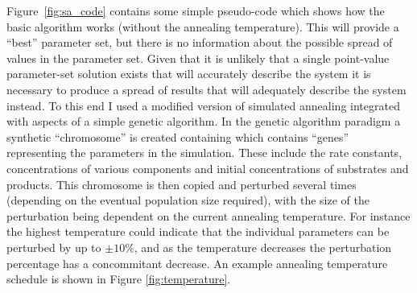 Figure~\ref{fig:sa_code} contains some simple pseudo-code which shows how the basic algorithm works (without the annealing temperature). This will provide a ``best'' parameter set, but there is no information about the possible spread of values in the parameter set. Given that it is unlikely that a single point-value parameter-set solution exists that will accurately describe the system it is necessary to produce a spread of results that will adequately describe the system instead. To this end I used a modified version of simulated annealing integrated with aspects of a simple genetic algorithm. In the genetic algorithm paradigm a synthetic ``chromosome'' is created containing which contains ``genes'' representing the parameters in the simulation. These include the rate constants, concentrations of various components and initial concentrations of substrates and products. This chromosome is then copied and perturbed several times (depending on the eventual population size required), with the size of the perturbation being dependent on the current annealing temperature. For instance the highest temperature could indicate that the individual parameters can be perturbed by up to $\pm 10\%$, and as the temperature decreases the perturbation percentage has a concommitant decrease. An example annealing temperature schedule is shown in Figure \ref{fig:temperature}.
